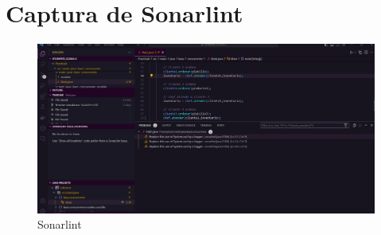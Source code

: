 \documentclass{article}
\begin{document}
\section{Captura de Sonarlint}

\begin{figure}[h]
    \centering
    \includegraphics[width=\textwidth]{problems.png}
    \caption{Sonarlint}
    \label{fig:sonarlint}
\end{figure}
\end{document}
